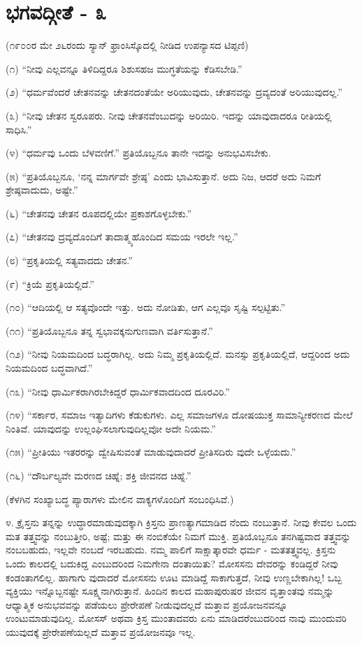 
\chapter{ಭಗವದ್ಗೀತೆ - ೩}

(೧೯೦೦ರ ಮೇ ೨೬ರಂದು ಸ್ಯಾನ್ ಫ್ರಾಂಸಿಸ್ಕೊದಲ್ಲಿ ನೀಡಿದ ಉಪನ್ಯಾಸದ ಟಿಪ್ಪಣಿ)

(೧) “ನೀವು ಎಲ್ಲವನ್ನೂ ತಿಳಿದಿದ್ದರೂ ಶಿಶುಸಹಜ ಮುಗ್ಧತೆಯನ್ನು ಕೆಡಿಸಬೇಡಿ.”

(೨) “ಧರ್ಮವೆಂದರೆ ಚೇತನವನ್ನು ಚೇತನದಂತೆಯೇ ಅರಿಯುವುದು, ಚೇತನವನ್ನು ದ್ರವ್ಯದಂತೆ ಅರಿಯುವುದಲ್ಲ.”

(೩) “ನೀವು ಚೇತನ ಸ್ವರೂಪರು. ನೀವು ಚೇತನವೆಂಬುದನ್ನು ಅರಿಯಿರಿ. ಇದನ್ನು ಯಾವುದಾದರೂ ರೀತಿಯಲ್ಲಿ ಸಾಧಿಸಿ.”

(೪) “ಧರ್ಮವು ಒಂದು ಬೆಳವಣಿಗೆ.” ಪ್ರತಿಯೊಬ್ಬನೂ ತಾನೇ ಇದನ್ನು ಅನುಭವಿಸಬೇಕು.

(೫) “ಪ್ರತಿಯೊಬ್ಬನೂ, ‘ನನ್ನ ಮಾರ್ಗವೇ ಶ್ರೇಷ್ಠ’ ಎಂದು ಭಾವಿಸುತ್ತಾನೆ. ಅದು ನಿಜ, ಆದರೆ ಅದು ನಿಮಗೆ ಶ್ರೇಷ್ಠವಾದುದು, ಅಷ್ಟೇ.”

(೬) “ಚೇತನವು ಚೇತನ ರೂಪದಲ್ಲಿಯೇ ಪ್ರಕಾಶಗೊಳ್ಳಬೇಕು.”

(೭) “ಚೇತನವು ದ್ರವ್ಯದೊಂದಿಗೆ ತಾದಾತ್ಮ್ಯಹೊಂದಿದ ಸಮಯ ಇರಲೇ ಇಲ್ಲ.”

(೮) “ಪ್ರಕೃತಿಯಲ್ಲಿ ಸತ್ಯವಾದದು ಚೇತನ.”

(೯) “ಕ್ರಿಯೆ ಪ್ರಕೃತಿಯಲ್ಲಿದೆ.”

(೧೦) “ಆದಿಯಲ್ಲಿ ಆ ಸತ್ಯವೊಂದೇ ಇತ್ತು. ಅದು ನೋಡಿತು, ಆಗ ಎಲ್ಲವೂ ಸೃಷ್ಟಿ ಸಲ್ಪಟ್ಟಿತು.”

(೧೧) “ಪ್ರತಿಯೊಬ್ಬನೂ ತನ್ನ ಸ್ವಭಾವಕ್ಕನುಗುಣವಾಗಿ ವರ್ತಿಸುತ್ತಾನೆ.”

(೧೨) “ನೀವು ನಿಯಮದಿಂದ ಬದ್ಧರಾಗಿಲ್ಲ. ಅದು ನಿಮ್ಮ ಪ್ರಕೃತಿಯಲ್ಲಿದೆ. ಮನಸ್ಸು ಪ್ರಕೃತಿಯಲ್ಲಿದೆ, ಆದ್ದರಿಂದ ಅದು ನಿಯಮದಿಂದ ಬದ್ಧವಾಗಿದೆ.”

(೧೩) “ನೀವು ಧಾರ್ಮಿಕರಾಗಿರಬೇಕಿದ್ದರೆ ಧಾರ್ಮಿಕವಾದದಿಂದ ದೂರವಿರಿ.”

(೧೪) “ಸರ್ಕಾರ, ಸಮಾಜ ಇತ್ಯಾದಿಗಳು ಕೆಡುಕುಗಳು. ಎಲ್ಲ ಸಮಾಜಗಳೂ ದೋಷಯುಕ್ತ ಸಾಮಾನ್ಯೀಕರಣದ ಮೇಲೆ ನಿಂತಿವೆ. ಯಾವುದನ್ನು ಉಲ್ಲಂಘಿಸಲಾಗುವುದಿಲ್ಲವೋ ಅದೇ ನಿಯಮ.”

(೧೫) “ಪ್ರೀತಿಯು ಇತರರನ್ನು ದ್ವೇಷಿಸುವಂತೆ ಮಾಡುವುದಾದರೆ ಪ್ರೀತಿಸದಿರು ವುದೇ ಒಳ್ಳೆಯದು.”

(೧೬) “ದೌರ್ಬಲ್ಯವೇ ಮರಣದ ಚಿಹ್ನೆ; ಶಕ್ತಿ ಜೀವನದ ಚಿಹ್ನೆ.”

(ಕೆಳಗಿನ ಸಂಖ್ಯಾಬದ್ಧ ಪ್ಯಾರಾಗಳು ಮೇಲಿನ ವಾಕ್ಯಗಳೊಂದಿಗೆ ಸಂಬಂಧಿಸಿವೆ.)

೪. ಕ್ರೈಸ್ತನು ತನ್ನನ್ನು ಉದ್ಧಾರಮಾಡುವುದಕ್ಕಾಗಿ ಕ್ರಿಸ್ತನು ಪ್ರಾಣತ್ಯಾಗಮಾಡಿದ ನೆಂದು ನಂಬುತ್ತಾನೆ. ನೀವು ಕೇವಲ ಒಂದು ಮತ ತತ್ತ್ವವನ್ನು ನಂಬುತ್ತೀರಿ, ಅಷ್ಟೆ; ಮತ್ತು ಈ ನಂಬಿಕೆಯೇ ನಿಮಗೆ ಮುಕ್ತಿ. ಪ್ರತಿಯೊಬ್ಬನೂ ತನಗಿಷ್ಟವಾದ ತತ್ತ್ವವನ್ನು ನಂಬಬಹುದು, ಇಲ್ಲವೇ ನಂಬದೆ ಇರಬಹುದು. ನಮ್ಮ ಪಾಲಿಗೆ ಸಾಕ್ಷಾತ್ಕಾರವೇ ಧರ್ಮ - ಮತತತ್ತ್ವವಲ್ಲ. ಕ್ರಿಸ್ತನು ಒಂದು ಕಾಲದಲ್ಲಿ ಬದುಕಿದ್ದ ಎಂಬುದರಿಂದ ನಿಮಗೇನಾ ದಂತಾಯಿತು? ಮೋಸಸನು ದೇವರನ್ನು ಕಂಡಿದ್ದರೆ ನೀವು ಕಂಡಂತಾಗಲಿಲ್ಲ. ಹಾಗಾಗು ವುದಾದರೆ ಮೋಸಸನು ಊಟ ಮಾಡಿದ್ದೆ ಸಾಕಾಗುತ್ತದೆ, ನೀವು ಉಣ್ಣಬೇಕಾಗಿಲ್ಲ! ಒಬ್ಬ ವ್ಯಕ್ತಿಯು ಇನ್ನೊಬ್ಬನಷ್ಟೇ ಸೂಕ್ಷ್ಮನಾಗಿರುತ್ತಾನೆ. ಹಿಂದಿನ ಕಾಲದ ಮಹಾಪುರುಷರ ಜೀವನ ವೃತ್ತಾಂತವು ನಮ್ಮನ್ನು ಆಧ್ಯಾತ್ಮಿಕ ಅನುಭವವನ್ನು ಪಡೆಯಲು ಪ್ರೇರೇಪಣೆ ನೀಡುವುದಲ್ಲದೆ ಮತ್ತಾವ ಪ್ರಯೋಜನವನ್ನೂ ಉಂಟುಮಾಡುವುದಿಲ್ಲ. ಮೋಸಸ್ ಅಥವಾ ಕ್ರಿಸ್ತ ಮುಂತಾದವರು ಏನು ಮಾಡಿದರೆಂಬುದರಿಂದ ನಾವು ಮುಂದುವರಿ ಯುವುದಕ್ಕೆ ಪ್ರೇರೇಪಣೆಯಲ್ಲದೆ ಮತ್ತಾವ ಪ್ರಯೋಜನವೂ ಇಲ್ಲ.

